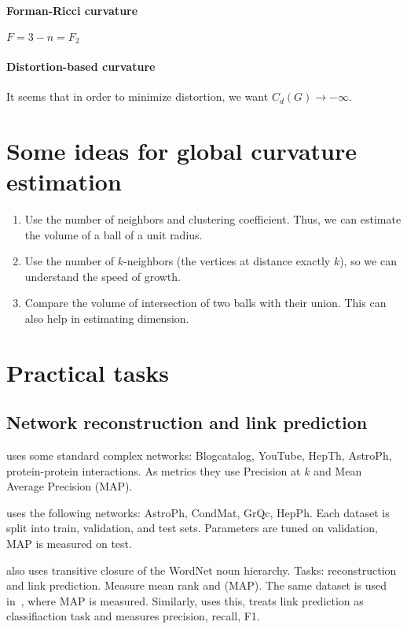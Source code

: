 \documentclass{article}
\begin{document}
\paragraph{Forman-Ricci curvature} $F = 3-n = F_2$

\paragraph{Distortion-based curvature} It seems that in order to minimize distortion, we want $C_d(G) \to -\infty$.
    
\section{Some ideas for global curvature estimation}

\begin{enumerate}
    \item Use the number of neighbors and clustering coefficient. Thus, we can estimate the volume of a ball of a unit radius. 
    \item Use the number of $k$-neighbors (the vertices at distance exactly $k$), so we can understand the speed of growth.
    \item Compare the volume of intersection of two balls with their union. This can also help in estimating dimension.
\end{enumerate}
            
\section{Practical tasks}

\subsection{Network reconstruction and link prediction}

\cite{goyal2018graph} uses some standard complex networks: Blogcatalog, YouTube, HepTh, AstroPh, protein-protein interactions. As metrics they use Precision at $k$ and Mean Average Precision (MAP).

\cite{nickel2017poincare} uses the following networks: AstroPh, CondMat, GrQc, HepPh. Each dataset is split into train, validation, and test sets. Parameters are tuned on validation, MAP is measured on test. 

\cite{nickel2017poincare} also uses transitive closure of the WordNet noun hierarchy. Tasks: reconstruction and link prediction. Measure mean rank and (MAP).  The same dataset is used in~\cite{sala2018representation}, where MAP is measured. Similarly, \cite{ganea2018hyperbolic} uses this, treats link prediction as classifiaction task and measures precision, recall, F1.
\end{document}
